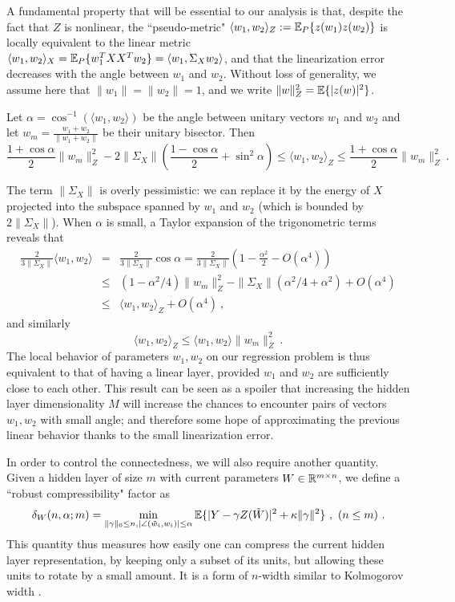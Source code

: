  A fundamental property that will be essential to our analysis is that, despite 
the fact that $Z$ is nonlinear, the ``pseudo-metric" $\langle w_1, w_2 \rangle_Z := {\mathbb{E}}_P \{ z(w_1) z(w_2) \} $ 
is locally equivalent to the linear metric $\langle w_1, w_2 \rangle_X = {\mathbb{E}}_P \{ w_1^T X X^T w_2 \} = \langle w_1, \Sigma_X w_2 \rangle$, and that the linearization error decreases with the angle between $w_1$ and $w_2$. Without loss of generality, we assume here that $\|w_1 \| = \| w_2 \| = 1$, and we write $\| w \|_Z^2 = {\mathbb{E}} \{ | z(w) |^2 \} $.
\begin{proposition}
\label{localdistprop}
Let $\alpha = \cos^{-1}( \langle w_1, w_2 \rangle )$ be the angle between unitary vectors $w_1$ and $w_2$ and let $w_m =  \frac{w_1 + w_2}{\| w_1 + w_2 \|}$ be their unitary bisector. 
Then
\begin{equation}
\label{localdisteq}
 \frac{1 + \cos \alpha}{2}  \| w_m  \|_Z^2 - 2 \| \Sigma_X \| \left( \frac{1-\cos \alpha}{2} + \sin^2 \alpha \right) \leq \langle w_1, w_2 \rangle_Z \leq \frac{1+\cos \alpha}{2}  \| w_m  \|_Z^2 ~.
\end{equation}
\end{proposition} 
The term $\| \Sigma_X \| $ is overly pessimistic: we can replace it by the energy of $X$ projected into the subspace spanned by $w_1$ and $w_2$ (which is bounded by $2 \| \Sigma_X \|$). 
When $\alpha$ is small, a Taylor expansion of the trigonometric terms reveals that 
\begin{eqnarray*}
\frac{2}{3 \| \Sigma_X \|} \langle w_1, w_2 \rangle &=& \frac{2}{3 \| \Sigma_X \|} \cos \alpha = \frac{2}{3\| \Sigma_X \|}(1 - \frac{\alpha^2}{2} - O(\alpha^4)) \\ 
&\leq& ( 1 - \alpha^2/4)\| w_m \|_Z^2 - \| \Sigma_X \|( \alpha^2/4 + \alpha^2) + O(\alpha^4) \\
&\leq & \langle w_1, w_2 \rangle_Z + O(\alpha^4) ~,
\end{eqnarray*}
and similarly 
$$\langle w_1, w_2 \rangle_Z \leq \langle w_1, w_2 \rangle \| w_m \|_Z^2~.$$
The local behavior of parameters $w_1, w_2$ on our regression problem is thus equivalent to that of having a linear layer, provided $w_1$ and $w_2$ are sufficiently close to each other.
This result can be seen as a spoiler that increasing the hidden layer dimensionality $M$ will increase the chances to encounter pairs of vectors $w_1, w_2$ with small angle; and therefore some hope of approximating the previous linear behavior thanks to the small linearization error. 

In order to control the connectedness, we will also require another quantity. Given a 
hidden layer of size $m$ with current parameters $W \in {\mathbb{R}}^{m \times n}$, we define a
``robust compressibility" factor as 
\begin{equation}
\label{compress}
\delta_W(n, \alpha; m) = \min_{ \|\gamma \|_0 \leq n, |\angle(\tilde{w}_i, w_i)| \leq \alpha} {\mathbb{E}} \{| Y - \gamma Z(\tilde{W}) |^2 + \kappa \| \gamma \|^2 \}~,~(n \leq m)~.
\end{equation} 
This quantity thus measures how easily one can compress the current hidden layer representation, 
by keeping only a subset of its units, but allowing these units to rotate by a small amount. It is a form 
of $n$-width similar to Kolmogorov width \cite{donoho}. 


